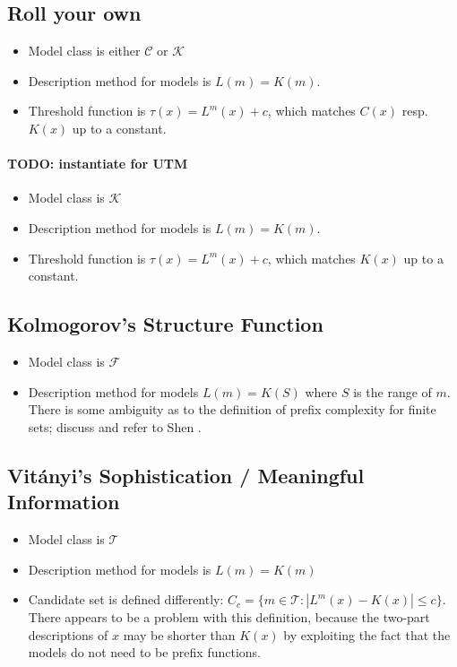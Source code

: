 \documentclass{style/llncs}
\newcommand{\C}{\mathscr C}
\newcommand{\T}{\mathscr T}
\newcommand{\F}{\mathscr F}
\newcommand{\K}{\mathscr K}
\begin{document}
\subsection{Roll your own}


\begin{itemize}
\item Model class is either $\C$ or $\K$
\item Description method for models is $L(m)=K(m)$.
\item Threshold function is $\tau(x)=L^m(x)+c$, which matches $C(x)$
  resp. $K(x)$ up to a constant.
\end{itemize}

\paragraph{TODO: instantiate for UTM}

\begin{itemize}
\item Model class is $\K$
\item Description method for models is $L(m)=K(m)$.
\item Threshold function is $\tau(x)=L^m(x)+c$, which matches $K(x)$
  up to a constant.
\end{itemize}


\subsection{Kolmogorov's Structure Function}

\begin{itemize}
\item Model class is $\F$
\item Description method for models $L(m)=K(S)$ where $S$ is the range
  of $m$. There is some ambiguity as to the definition of prefix
  complexity for finite sets; discuss and refer to Shen \cite{TODO}.
\end{itemize}

\subsection{Vit\'anyi's Sophistication / Meaningful Information}

\begin{itemize}
\item Model class is $\T$
\item Description method for models is $L(m)=K(m)$
\item Candidate set is defined differently: $C_c=\{m\in\T:|L^m(x)-K(x)|\le
  c\}$. There appears to be a problem with this definition, because
  the two-part descriptions of $x$ may be shorter than $K(x)$ by
  exploiting the fact that the models do not need to be prefix functions.
\end{itemize}
\end{document}
